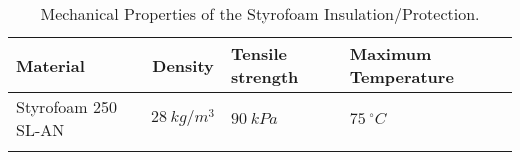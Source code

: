 \begin{longtable}{|m{} |c|m{}|m{}|}
\hline
\textbf{Material} & \textbf{Density} & \textbf{Tensile strength} & \textbf{Maximum Temperature} \\ \hline 
Styrofoam 250 SL-AN & $28\ kg/m^3$ & $90\ kPa$ & $75\ ^\circ C$ \\ \hline

\caption{Mechanical Properties of the Styrofoam Insulation/Protection.}
\label{table:wall_styrofoam}
\end{longtable}